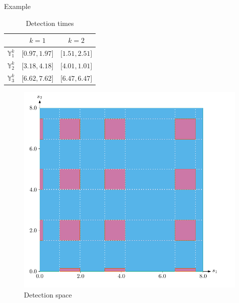 \documentclass{beamer}
\begin{document}
        \begin{frame}{Example}
            \begin{minipage}{0.45\textwidth}
                \begin{table}
                    \begin{tabular}{@{} rcc @{}}
                        \toprule
                        & $k=1$ & $k=2$ \\
                        \midrule
                        $\mathbb{Y}_1^k$ & $\lbrack0.97, 1.97\rbrack$ & $\lbrack1.51, 2.51\rbrack$  \\
                        $\mathbb{Y}_2^k$ & $\lbrack3.18, 4.18\rbrack$ & $\lbrack4.01, 1.01\rbrack$ \\
                        $\mathbb{Y}_3^k$ & $\lbrack6.62, 7.62\rbrack$ & $\lbrack6.47, 6.47\rbrack$ \\
                        \bottomrule
                    \end{tabular}
                    \caption{Detection times}
                \end{table}
            \end{minipage}
            \hfill
            \begin{minipage}{0.5\textwidth}
                \begin{figure}
                    \includegraphics[height=0.7\textheight]{imgs/detection_space}
                    \caption{Detection space}
                \end{figure}
            \end{minipage}
        \end{frame}
\end{document}
